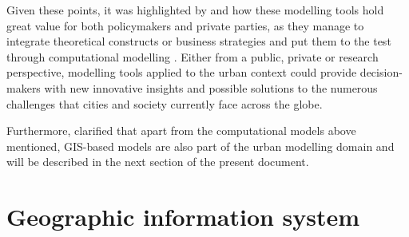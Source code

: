 \documentclass[12pt, a4paper]{report}
\begin{document}

Given these points, it was highlighted by \cite{battyUrbanModeling2009a} and \cite{wilsonFutureUrbanModelling2018} how these modelling tools hold great value for both policymakers and private parties, as they manage to integrate theoretical constructs or business strategies and put them to the test through computational modelling \citep{battyUrbanModeling2009a}. Either from a public, private or research perspective, modelling tools applied to the urban context could provide decision-makers with new innovative insights and possible solutions to the numerous challenges that cities and society currently face across the globe.

Furthermore, \cite{battyUrbanModeling2009a} clarified that apart from the computational models above mentioned, GIS-based models are also part of the urban modelling domain and will be described in the next section of the present document.













\section{Geographic information system}
\end{document}

